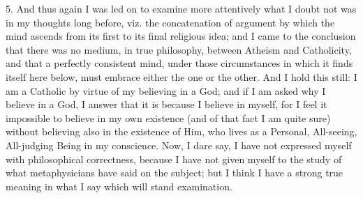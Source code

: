 5. And thus again I was led on to examine more attentively
what I doubt not was in my thoughts long before, viz. the concatenation
of argument by which the mind ascends from its first to its final
religious idea; and I came to the conclusion that there was no medium,
in true philosophy, between Atheism and Catholicity, and that a
perfectly consistent mind, under those circumstances in which it finds
itself here below, must embrace either the one or the other. And I hold
this still: I am a Catholic by virtue of my believing in a God; and if I
am asked why I believe in a God, I answer that it is because I believe
in myself, for I feel it impossible to believe in my own existence (and
of that fact I am quite sure) without believing also in the existence of
Him, who lives as a Personal, All-seeing, All-judging Being in my
conscience. Now, I dare say, I have not expressed myself with
philosophical correctness, because I have not given myself to the study
of what metaphysicians have said on the subject; but I think I have a
strong true meaning in what I say which will stand examination.

